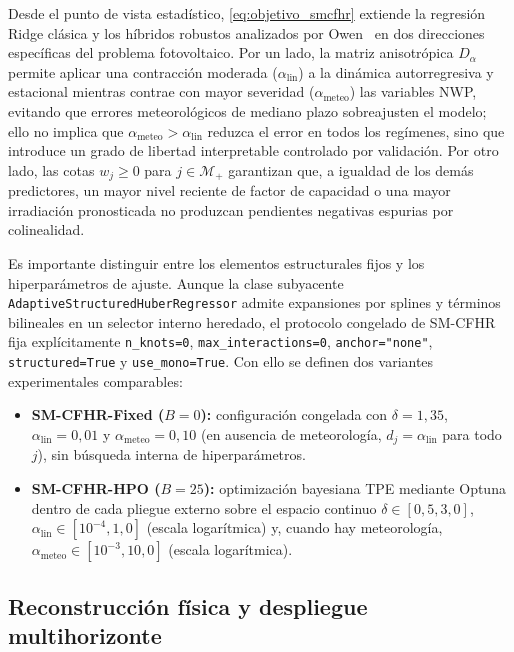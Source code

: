 Desde el punto de vista estadístico, \eqref{eq:objetivo_smcfhr} extiende la regresión Ridge clásica \cite{hoerl1970} y los híbridos robustos analizados por Owen~\cite{owen2007} en dos direcciones específicas del problema fotovoltaico. Por un lado, la matriz anisotrópica $D_\alpha$ permite aplicar una contracción moderada ($\alpha_{\mathrm{lin}}$) a la dinámica autorregresiva y estacional mientras contrae con mayor severidad ($\alpha_{\mathrm{meteo}}$) las variables NWP, evitando que errores meteorológicos de mediano plazo sobreajusten el modelo; ello no implica que $\alpha_{\mathrm{meteo}} > \alpha_{\mathrm{lin}}$ reduzca el error en todos los regímenes, sino que introduce un grado de libertad interpretable controlado por validación. Por otro lado, las cotas $w_j \ge 0$ para $j \in \mathcal{M}_+$ garantizan que, a igualdad de los demás predictores, un mayor nivel reciente de factor de capacidad o una mayor irradiación pronosticada no produzcan pendientes negativas espurias por colinealidad.

Es importante distinguir entre los elementos estructurales fijos y los hiperparámetros de ajuste. Aunque la clase subyacente \texttt{AdaptiveStructuredHuberRegressor} admite expansiones por splines y términos bilineales en un selector interno heredado, el protocolo congelado de SM-CFHR fija explícitamente \texttt{n\_knots=0}, \texttt{max\_interactions=0}, \texttt{anchor="none"}, \texttt{structured=True} y \texttt{use\_mono=True}. Con ello se definen dos variantes experimentales comparables:
\begin{itemize}
    \item \textbf{SM-CFHR-Fixed ($B=0$):} configuración congelada con $\delta = 1{,}35$, $\alpha_{\mathrm{lin}} = 0{,}01$ y $\alpha_{\mathrm{meteo}} = 0{,}10$ (en ausencia de meteorología, $d_j = \alpha_{\mathrm{lin}}$ para todo $j$), sin búsqueda interna de hiperparámetros.
    \item \textbf{SM-CFHR-HPO ($B=25$):} optimización bayesiana TPE mediante Optuna dentro de cada pliegue externo sobre el espacio continuo $\delta \in [0{,}5, 3{,}0]$, $\alpha_{\mathrm{lin}} \in [10^{-4}, 1{,}0]$ (escala logarítmica) y, cuando hay meteorología, $\alpha_{\mathrm{meteo}} \in [10^{-3}, 10{,}0]$ (escala logarítmica).
\end{itemize}

\subsection{Reconstrucción física y despliegue multihorizonte}

